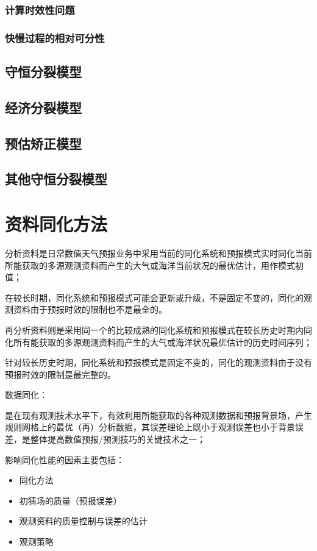 \documentclass{article}
\begin{document}
\subsubsection{计算时效性问题}
\subsubsection{快慢过程的相对可分性}
\subsection{守恒分裂模型}
\subsection{经济分裂模型}
\subsection{预估矫正模型}
\subsection{其他守恒分裂模型}
\newpage
\section{资料同化方法}
分析资料是日常数值天气预报业务中采用当前的同化系统和预报模式实时同化当前所能获取的多源观测资料而产生的大气或海洋当前状况的最优估计，用作模式初值；

在较长时期，同化系统和预报模式可能会更新或升级，不是固定不变的，同化的观测资料由于预报时效的限制也不是最全的。

再分析资料则是采用同一个的比较成熟的同化系统和预报模式在较长历史时期内同化所有能获取的多源观测资料而产生的大气或海洋状况最优估计的历史时间序列；

针对较长历史时期，同化系统和预报模式是固定不变的，同化的观测资料由于没有预报时效的限制是最完整的。

数据同化：

是在现有观测技术水平下，有效利用所能获取的各种观测数据和预报背景场，产生规则网格上的最优（再）分析数据，其误差理论上既小于观测误差也小于背景误差，是整体提高数值预报/预测技巧的关键技术之一；

影响同化性能的因素主要包括：
\begin{itemize}
    \item 同化方法
    \item 初猜场的质量（预报误差）
    \item 观测资料的质量控制与误差的估计
    \item 观测策略
\end{itemize}
\end{document}
